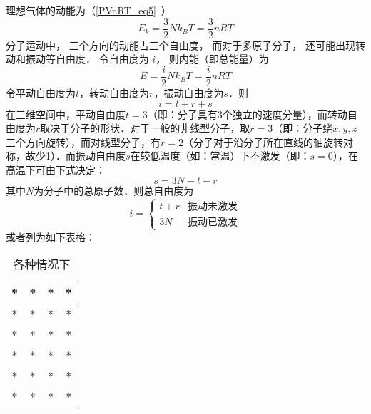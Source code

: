 
\begin{issues}
\issueDraft
\end{issues}


理想气体的动能为（\autoref{PVnRT_eq5}~）
\begin{equation}
E_k = \frac32 Nk_B T = \frac{3}{2}nRT
\end{equation}
分子运动中， 三个方向的动能占三个自由度， 而对于多原子分子， 还可能出现转动和振动等自由度． 令自由度为 $i$， 则内能（即总能量）为
\begin{equation}\label{IdgEng_eq1}
E = \frac{i}{2}Nk_B T = \frac{i}{2}nRT
\end{equation}
令平动自由度为$t$，转动自由度为$r$，振动自由度为$s$．则
\begin{equation}
i=t+r+s
\end{equation}
在三维空间中，平动自由度$t=3$（即：分子具有3个独立的速度分量），而转动自由度为$r$取决于分子的形状．对于一般的非线型分子，取$r=3$（即：分子绕$x,y,z$三个方向旋转），而对线型分子，有$r=2$（分子对于沿分子所在直线的轴旋转对称，故少1）．而振动自由度$s$在较低温度（如：常温）下不激发（即：$s=0$），在高温下可由下式决定：
\begin{equation}
s=3N-t-r
\end{equation}
其中$N$为分子中的总原子数．则总自由度为
\begin{equation}
i=\left\{\begin{matrix}{t+r}&{\text{振动未激发}}\\{3N}&{振动已激发}\end{matrix}\right.
\end{equation}
或者列为如下表格：\begin{table}[ht]
\centering
\caption{各种情况下}\label{IdgEng_tab1}
\begin{tabular}{|c|c|c|c|}
\hline
* & * & * & * \\
\hline
* & * & * & * \\
\hline
* & * & * & * \\
\hline
* & * & * & * \\
\hline
* & * & * & * \\
\hline
* & * & * & * \\
\hline
\end{tabular}
\end{table}